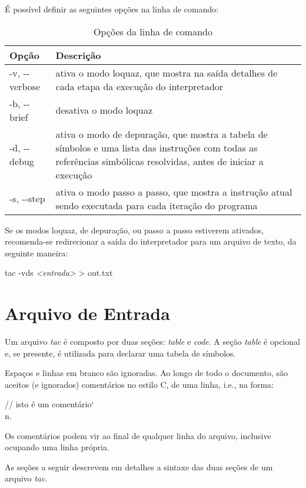 \documentclass[12pt,a4paper,extrafontsizes,article]{memoir}
\newcommand*{\srcfont}{\fontfamily{pcr}\selectfont}
\begin{document}
É possível definir as seguintes opções na linha de comando:

\begin{table}
\centering
\caption{Opções da linha de comando}
\label{tab:cmdlineopts}
\begin{tabular}{| l | l |} \toprule
Opção & Descrição\\ \midrule
{\srcfont -v, -{}-verbose} & \parbox{0.7\linewidth}{ativa o modo loquaz, que mostra na saída detalhes de cada etapa da
execução do interpretador}\\ \midrule
{\srcfont -b, -{}-brief} & \parbox{0.7\linewidth}{desativa o modo loquaz}\\ \midrule
{\srcfont -d, -{}-debug} & \parbox{0.7\linewidth}{ativa o modo de depuração, que mostra a tabela de símbolos e uma lista
das instruções com todas as referências simbólicas resolvidas, antes de iniciar a execução}\\ \midrule
{\srcfont -s, -{}-step} & \parbox{0.7\linewidth}{ativa o modo passo a passo, que mostra a instrução atual sendo
executada para cada iteração do programa}\\ \bottomrule
\end{tabular}
\end{table}

Se os modos loquaz, de depuração, ou passo a passo estiverem ativados, recomenda-se redirecionar a saída do
interpretador para um arquivo de texto, da seguinte maneira:

\bigskip
{\srcfont tac -vds \textit{<entrada>} > out.txt}


\clearpage
\chapter{Arquivo de Entrada}

Um arquivo \textit{tac} é composto por duas seções: \textit{table} e \textit{code}. A seção \textit{table} é opcional e,
se presente, é utilizada para declarar uma tabela de símbolos.

Espaços e linhas em branco são ignoradas. Ao longo de todo o documento, são aceitos (e ignorados) comentários no estilo
C, de uma linha, i.e., na forma:

\bigskip
{\srcfont // isto é um comentário{\color{red}\char`\\n}}.
\bigskip

Os comentários podem vir ao final de qualquer linha do arquivo, inclusive ocupando uma linha própria.

As seções a seguir descrevem em detalhes a sintaxe das duas seções de um arquivo \textit{tac}.
\end{document}
